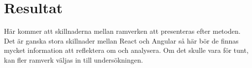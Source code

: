 \section{Resultat}
\label{sec:axel-results}

Här kommer att skillnaderna mellan ramverken att presenteras efter metoden. Det är ganska stora skillnader mellan React och Angular så här bör de finnas mycket information att reflektera om och analysera. Om det skulle vara för tunt, kan fler ramverk väljas in till undersökningen. 
